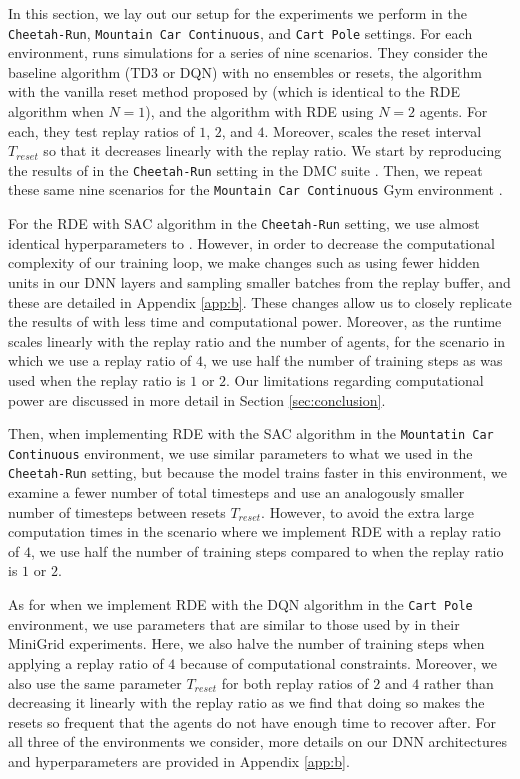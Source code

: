 \documentclass[base]{subfiles}
\begin{document}
In this section, we lay out our setup for the experiments we perform in the \texttt{Cheetah-Run}, \texttt{Mountain Car Continuous}, and \texttt{Cart Pole} settings.
For each environment, \cite{kim2023} runs simulations for a series of nine scenarios.
They consider the baseline algorithm (TD3 or DQN) with no ensembles or resets, the algorithm with the vanilla reset method proposed by \cite{nikishin2022} (which is identical to the RDE algorithm when $N=1$), and the algorithm with RDE using $N=2$ agents. 
For each, they test replay ratios of $1$, $2$, and $4$.
Moreover, \cite{kim2023} scales the reset interval $T_{reset}$ so that it decreases linearly with the replay ratio. 
We start by reproducing the results of \cite{kim2023} in the \texttt{Cheetah-Run} setting in the DMC suite \cite{dmc}. 
Then, we repeat these same nine scenarios for the \texttt{Mountain Car Continuous} Gym environment \cite{gym}. 

For the RDE with SAC algorithm in the \texttt{Cheetah-Run} setting, we use almost identical hyperparameters to \cite{kim2023}.
However, in order to decrease the computational complexity of our training loop, we make changes such as using fewer hidden units in our DNN layers and sampling smaller batches from the replay buffer, and these are detailed in Appendix \ref{app:b}. 
These changes allow us to closely replicate the results of \cite{kim2023} with less time and computational power.
Moreover, as the runtime scales linearly with the replay ratio and the number of agents, for the scenario in which we use a replay ratio of $4$, we use half the number of training steps as was used when the replay ratio is $1$ or $2$. 
Our limitations regarding computational power are discussed in more detail in Section \ref{sec:conclusion}.

Then, when implementing RDE with the SAC algorithm in the \texttt{Mountatin Car Continuous} environment, we use similar parameters to what we used in the \texttt{Cheetah-Run} setting, but because the model trains faster in this environment, we examine a fewer number of total timesteps and use an analogously smaller number of timesteps between resets $T_{reset}$.
However, to avoid the extra large computation times in the scenario where we implement RDE with a replay ratio of $4$, we use half the number of training steps compared to when the replay ratio is $1$ or $2$.

As for when we implement RDE with the DQN algorithm in the \texttt{Cart Pole} environment, we use parameters that are similar to those used by \cite{kim2023} in their MiniGrid experiments. 
Here, we also halve the number of training steps when applying a replay ratio of $4$ because of computational constraints.
Moreover, we also use the same parameter $T_{reset}$ for both replay ratios of $2$ and $4$ rather than decreasing it linearly with the replay ratio as we find that doing so makes the resets so frequent that the agents do not have enough time to recover after.
For all three of the environments we consider, more details on our DNN architectures and hyperparameters are provided in Appendix \ref{app:b}. 
\end{document}
